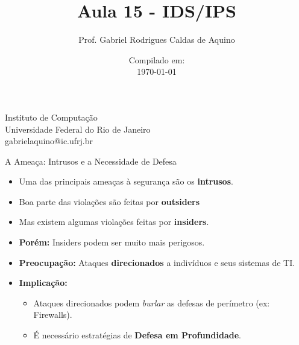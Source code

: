\title{Aula 15 - IDS/IPS}

\author{Prof. Gabriel Rodrigues Caldas de Aquino}

\institute
{
    Instituto de Computação \\
    Universidade Federal do Rio de Janeiro\\
    gabrielaquino@ic.ufrj.br%
}
\date{Compilado em: \\ \today} %




\begin{frame}
    \titlepage
\end{frame}

\begin{frame}{A Ameaça: Intrusos e a Necessidade de Defesa}
    \begin{itemize}
        \item Uma das principais ameaças à segurança são os \textbf{intrusos}.



        \item Boa parte das violações são feitas por \textbf{outsiders}
        \item Mas existem algumas violações feitas por \textbf{insiders}.
        \item \textbf{Porém:} Insiders podem ser muito mais perigosos.


        \item \textbf{Preocupação:} Ataques \textbf{direcionados} a indivíduos e seus sistemas de TI.


        \item \textbf{Implicação:}
              \begin{itemize}
                  \item Ataques direcionados podem \textit{burlar} as defesas de perímetro (ex: Firewalls).
                  \item É necessário estratégias de \textbf{Defesa em Profundidade}.
              \end{itemize}
    \end{itemize}
\end{frame}

